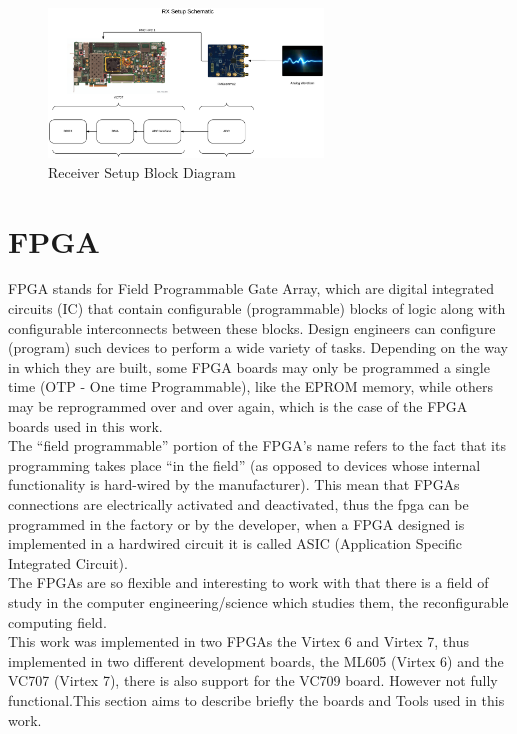 \begin{figure}[htbp]
    \centering
    \includegraphics[width=0.65\textwidth]{./figures/rx_setup}
    \caption{ Receiver Setup Block Diagram
    \label{fig:rxsetup}}
\end{figure}

\section{FPGA}

FPGA stands for Field Programmable Gate Array, which are digital integrated
circuits (IC) that contain configurable (programmable) blocks of logic along
with configurable interconnects between these blocks. Design engineers can
configure (program) such devices to perform a wide variety of tasks. Depending
on the way in which they are built, some FPGA boards may only be programmed a
single time (OTP - One time Programmable), like the EPROM memory, while others
may be reprogrammed over and over again, which is the case of the FPGA boards
used in this work.\cite{max2004}\\

The “field programmable” portion of the FPGA’s name refers to the fact that its
programming takes place “in the field” (as opposed to devices whose internal
functionality is hard-wired by the manufacturer). This mean that FPGAs
connections are electrically activated and deactivated, thus the fpga can be
programmed in the factory or by the developer, when a  FPGA designed is
implemented in a hardwired circuit it is called ASIC (Application Specific
Integrated Circuit).\\

The FPGAs are so flexible and interesting to work with that there is a field of
study in the computer engineering/science which studies them, the reconfigurable
computing field.\\

This work was implemented in two FPGAs the Virtex 6 and Virtex 7, thus
implemented in two different development boards, the ML605 (Virtex 6) and the
VC707 (Virtex 7), there is also support for the VC709 board. However not fully
functional.This section aims to describe briefly the boards and Tools used in
this work.


